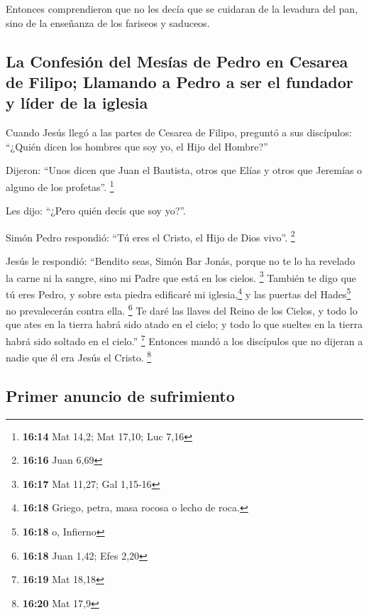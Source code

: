 \begin{paracol}{2}
 Entonces comprendieron que no les decía que se cuidaran
de la levadura del pan, sino de la enseñanza de los fariseos y saduceos.

\hypertarget{la-confesiuxf3n-del-mesuxedas-de-pedro-en-cesarea-de-filipo-llamando-a-pedro-a-ser-el-fundador-y-luxedder-de-la-iglesia}{%
\subsection{La Confesión del Mesías de Pedro en Cesarea de Filipo;
Llamando a Pedro a ser el fundador y líder de la
iglesia}\label{la-confesiuxf3n-del-mesuxedas-de-pedro-en-cesarea-de-filipo-llamando-a-pedro-a-ser-el-fundador-y-luxedder-de-la-iglesia}}

 Cuando Jesús llegó a las partes de Cesarea de Filipo,
preguntó a sus discípulos: ``¿Quién dicen los hombres que soy yo, el
Hijo del Hombre?''

 Dijeron: ``Unos dicen que Juan el Bautista, otros que
Elías y otros que Jeremías o alguno de los profetas''. \footnote{\textbf{16:14}
  Mat 14,2; Mat 17,10; Luc 7,16}

 Les dijo: ``¿Pero quién decís que soy yo?''.

 Simón Pedro respondió: ``Tú eres el Cristo, el Hijo de
Dios vivo''. \footnote{\textbf{16:16} Juan 6,69}

 Jesús le respondió: ``Bendito seas, Simón Bar Jonás,
porque no te lo ha revelado la carne ni la sangre, sino mi Padre que
está en los cielos. \footnote{\textbf{16:17} Mat 11,27; Gal 1,15-16}
 También te digo que tú eres Pedro, y sobre esta piedra
edificaré mi iglesia,\footnote{\textbf{16:18} Griego, petra, masa rocosa
  o lecho de roca.} y las puertas del Hades\footnote{\textbf{16:18} o,
  Infierno} no prevalecerán contra ella. \footnote{\textbf{16:18} Juan
  1,42; Efes 2,20}  Te daré las llaves del Reino de los
Cielos, y todo lo que ates en la tierra habrá sido atado en el cielo; y
todo lo que sueltes en la tierra habrá sido soltado en el cielo.''
\footnote{\textbf{16:19} Mat 18,18}  Entonces mandó a los
discípulos que no dijeran a nadie que él era Jesús el Cristo.
\footnote{\textbf{16:20} Mat 17,9}

\hypertarget{primer-anuncio-de-sufrimiento}{%
\subsection{Primer anuncio de
sufrimiento}\label{primer-anuncio-de-sufrimiento}}


\end{paracol}
